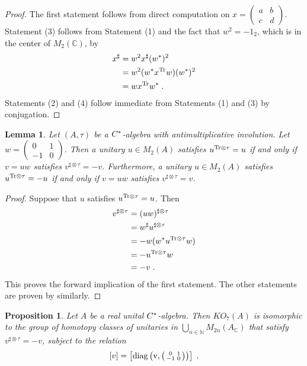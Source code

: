 \documentclass[12pt, reqno]{amsart}
\newtheorem{lemma}[thm]{Lemma}
\newtheorem{prop}[thm]{Proposition}
\theoremstyle{definition}
\def\C{{\mathbb C}}
\def\N{{\mathbb N}}
\def\1{{1}}
\def\Ttau{ ^{\rm{Tr} \otimes \tau}}
\def\stau{^{\sharp \otimes \tau}}
\def\diag{\rm{diag}}
\newcommand{\sm}[4]
	{ \left( \begin{smallmatrix} {#1} & {#2} \\ {#3} & {#4} \end{smallmatrix} \right)  }
\begin{document}
\begin{proof}
The first statement follows from direct computation on $x = \left( \begin{smallmatrix} a & b \\ c & d \end{smallmatrix} \right)$. Statement (3) follows from Statement (1) and the fact that $w^2 = -1_2$, which is in the center of $M_2(\C)$, by
\begin{align*}
x^\sharp &= w^2 x^\sharp (w^*)^2 \\
	&= w^2 (w^* x^{\rm{Tr}} w) (w^*)^2 \\
	&= w x^{\rm{Tr}} w^*  \; .
\end{align*}
Statements (2) and (4) follow immediate from Statements (1) and (3) by conjugation.
\end{proof}

\begin{lemma} \label{lemma-sharp/trace}
Let $(A, \tau)$ be a $C \sp *$-algebra with antimultiplicative involution. Let $w = \left( \begin{smallmatrix} 0 & 1 \\ -1 & 0 \end{smallmatrix} \right)$.
Then a unitary $u \in M_2(A)$ satisfies
$u\Ttau =  u$ if and only if $v = u w$ satisfies $v\stau = - v$.
Furthermore, a unitary $u \in M_2(A)$ satisfies
$u\Ttau =  -u$ if and only if $v = u w$ satisfies $v\stau =  v$.
\end{lemma}

\begin{proof}
Suppose that $u$ satisfies $u\Ttau = u$. Then
\begin{align*}
v\stau &= (uw)\stau \\
	&= w^\sharp u\stau \\
	&= -w (w^* u\Ttau w) \\	
	&= -u\Ttau w \\
	&= -v \;.
\end{align*}
This proves the forward implication of the first statement. The other statements are proven by similarly.
\end{proof}

\begin{prop} \label{prop-K(-1)}
Let $A$ be a real unital $C \sp *$-algebra. Then $KO_{7}(A)$ is isomorphic to the group of homotopy classes of unitaries in 
$\bigcup_{n \in \N} M_{2n}(A_\C)$ that satisfy $v\stau = -v$, subject to the relation
$$[v] = \left[ \diag\left(v,\sm{0}{\1}{-\1}{0} \right) \right] \; .$$
\end{prop}
\end{document}

